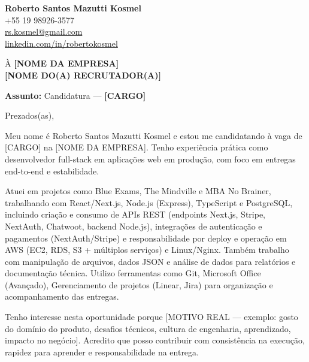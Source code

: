 \documentclass{article}
\begin{document}
\begin{center}
\textbf{Roberto Santos Mazutti Kosmel} \\
+55 19 98926-3577 \\
\href{mailto:rs.kosmel@gmail.com}{rs.kosmel@gmail.com} \\
\href{https://www.linkedin.com/in/robertokosmel/}{linkedin.com/in/robertokosmel}
\end{center}

\vspace{2mm}

À \textbf{[NOME DA EMPRESA]} \\
\textbf{[NOME DO(A) RECRUTADOR(A)]} \\

\vspace{2mm}

\textbf{Assunto:} Candidatura — \textbf{[CARGO]}

\vspace{4mm}

Prezados(as),

\vspace{2mm}

Meu nome é Roberto Santos Mazutti Kosmel e estou me candidatando à vaga de [CARGO] na [NOME DA EMPRESA]. Tenho experiência prática como desenvolvedor full-stack em aplicações web em produção, com foco em entregas end-to-end e estabilidade.

\vspace{2mm}

Atuei em projetos como Blue Exams, The Mindville e MBA No Brainer, trabalhando com React/Next.js, Node.js (Express), TypeScript e PostgreSQL, incluindo criação e consumo de APIs REST (endpoints Next.js, Stripe, NextAuth, Chatwoot, backend Node.js), integrações de autenticação e pagamentos (NextAuth/Stripe) e responsabilidade por deploy e operação em AWS (EC2, RDS, S3 + múltiplos serviços) e Linux/Nginx. Também trabalho com manipulação de arquivos, dados JSON e análise de dados para relatórios e documentação técnica. Utilizo ferramentas como Git, Microsoft Office (Avançado), Gerenciamento de projetos (Linear, Jira) para organização e acompanhamento das entregas.

\vspace{2mm}

Tenho interesse nesta oportunidade porque [MOTIVO REAL — exemplo: gosto do domínio do produto, desafios técnicos, cultura de engenharia, aprendizado, impacto no negócio]. Acredito que posso contribuir com consistência na execução, rapidez para aprender e responsabilidade na entrega.
\end{document}
